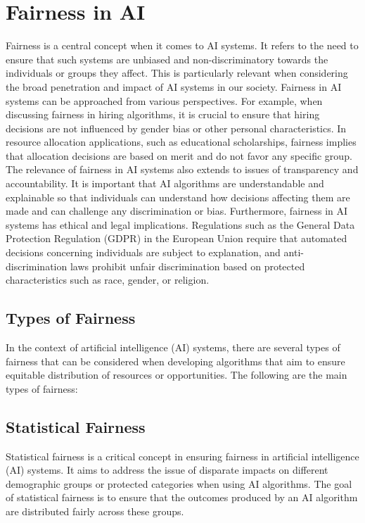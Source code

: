 \documentclass[12pt,a4paper,openright,twoside]{book}
\begin{document}
\section{Fairness in AI}
Fairness is a central concept when it comes to AI systems. It refers to the need to ensure that such systems are unbiased and non-discriminatory towards the individuals or groups they affect. This is particularly relevant when considering the broad penetration and impact of AI systems in our society.
Fairness in AI systems can be approached from various perspectives. For example, when discussing fairness in hiring algorithms, it is crucial to ensure that hiring decisions are not influenced by gender bias or other personal characteristics. In resource allocation applications, such as educational scholarships, fairness implies that allocation decisions are based on merit and do not favor any specific group.
The relevance of fairness in AI systems also extends to issues of transparency and accountability. It is important that AI algorithms are understandable and explainable so that individuals can understand how decisions affecting them are made and can challenge any discrimination or bias.
Furthermore, fairness in AI systems has ethical and legal implications. Regulations such as the General Data Protection Regulation (GDPR) in the European Union require that automated decisions concerning individuals are subject to explanation, and anti-discrimination laws prohibit unfair discrimination based on protected characteristics such as race, gender, or religion.

\subsection{Types of Fairness}

In the context of artificial intelligence (AI) systems, there are several types of fairness that can be considered when developing algorithms that aim to ensure equitable distribution of resources or opportunities. The following are the main types of fairness:

\subsection{Statistical Fairness}
Statistical fairness is a critical concept in ensuring fairness in artificial intelligence (AI) systems. It aims to address the issue of disparate impacts on different demographic groups or protected categories when using AI algorithms. The goal of statistical fairness is to ensure that the outcomes produced by an AI algorithm are distributed fairly across these groups.
\end{document}
